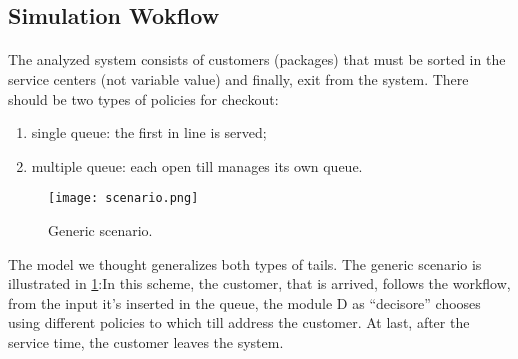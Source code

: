 \subsection{Simulation Wokflow}
\paragraph{}
The analyzed system consists of customers (packages) that must be sorted in the service centers (not variable value) and finally, exit from the system. There should be two types of policies for checkout: 
\begin{enumerate}
	\item single queue: the first in line is served; 
	\item multiple queue: each open till manages its own queue.
\end{enumerate}
\begin{figure}[ht]
  \begin{center}
  \texttt{[image: scenario.png]}
  \caption{Generic scenario.}
  \label{fig:gs}
  \end{center}
\end{figure}
The model we thought generalizes both types of tails. The generic scenario is illustrated in \ref{fig:gs}:In this scheme, the customer, that is arrived, follows the workflow, from the input it’s inserted in the queue, the module D as “decisore” chooses using different policies to which till address the customer. At last, after the service time, the customer leaves the system. 
